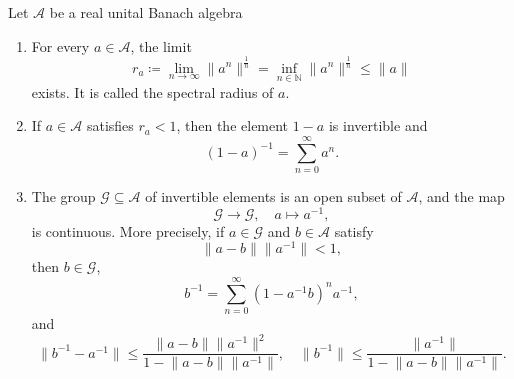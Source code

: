 \begin{theorem}[Inverse] \label{thm: inverse in Banach algebra}
    Let \(\mathcal{A}\) be a real unital Banach algebra 
    \begin{enumerate}
        \item For every \(a \in \mathcal{A} \), the limit 
        \[
            r_a \coloneqq \lim_{n \to \infty} \lVert a^n \rVert^{\frac{1}{n}} = \inf _{n \in \mathbb{N} } \lVert a^n \rVert^{\frac{1}{n}} \le \lVert a \rVert    
        \]
        exists. It is called the spectral radius of \(a\). 
        \item If \(a \in \mathcal{A} \) satisfies \(r_a < 1\), then the element \(1 - a\) is invertible and
        \[
            (1 - a)^{-1} = \sum_{n=0}^{\infty} a^n.
        \]
        \item The group \(\mathcal{G} \subseteq \mathcal{A} \) of invertible elements is an open subset of \(\mathcal{A} \), and the map 
        \[
            \mathcal{G} \to \mathcal{G},  \quad  a \mapsto a^{-1},
        \]
        is continuous. More precisely, if \(a \in \mathcal{G} \) and \(b \in \mathcal{A} \) satisfy 
        \[
            \lVert a - b \rVert \lVert a^{-1} \rVert < 1,  
        \]  
        then \(b \in \mathcal{G}\),
        \[
            b^{-1} = \sum_{n=0}^{\infty} \left( 1 - a^{-1} b \right)^n a^{-1},  
        \] 
        and
        \[
            \lVert b^{-1} - a^{-1} \rVert \le \frac{\lVert a - b \rVert \lVert a^{-1} \rVert^2  }{1 - \lVert a - b \rVert \lVert a^{-1} \rVert  }, \quad \lVert b^{-1} \rVert \le \frac{\lVert a^{-1} \rVert }{1 - \lVert a - b \rVert \lVert a^{-1} \rVert  }.
        \]
    \end{enumerate}
\end{theorem}

